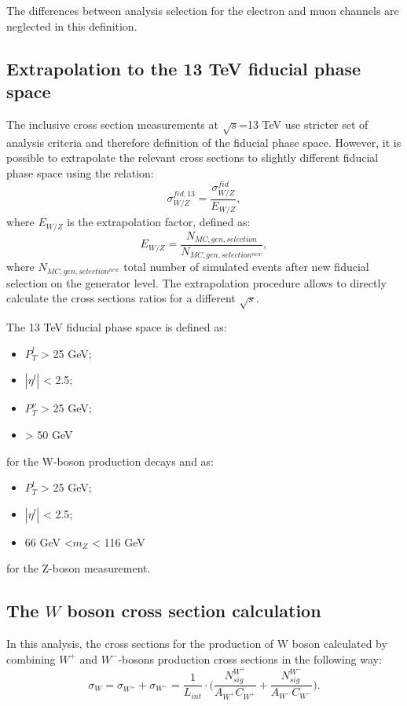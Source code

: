 The differences between analysis selection for the electron and muon channels are neglected in this definition.

\subsection{Extrapolation to the 13 TeV fiducial phase space}

The  inclusive cross section measurements at $\sqrt{s}$=13 TeV use stricter set of analysis criteria and therefore definition of the fiducial phase space. However, it is possible to extrapolate the relevant cross sections to slightly different fiducial phase space using the relation:
\begin{equation}
\sigma^{fid,13}_{W/Z} = \frac{\sigma^{fid}_{W/Z}}{E_{W/Z}},
\end{equation}
where $E_{W/Z}$ is the extrapolation factor, defined as:
\begin{equation}
E_{W/Z}=\frac{N_{MC,gen, selection}}{N_{MC,gen, selection^{new}}},
\end{equation}
where $N_{MC,gen, selection^{new}}$ total number of simulated events after new fiducial selection on the generator level. The extrapolation procedure allows to directly calculate the cross sections ratios for a different $\sqrt{s}$.

The 13 TeV fiducial phase space is defined as:
\begin{itemize}
\item $P_T^l$ > 25 GeV;
\item $|\eta^l|$ < 2.5;
\item $P_T^{\nu}$ > 25 GeV;
\item \mtw > 50 GeV
\end{itemize}
for the W-boson production decays and as:
\begin{itemize}
\item $P_T^l$ > 25 GeV;
\item $|\eta^l|$ < 2.5;
\item 66 GeV <$m_{Z}$ < 116 GeV
\end{itemize}
for the Z-boson measurement.

\subsection{The $W$ boson cross section calculation}\label{sec:Wcs}
In this analysis, the cross sections for the production of W boson calculated by combining $W^{+}$ and $W^{-}$-bosons production cross sections in the following way:
\begin{equation}
\sigma_{W}=\sigma_{W^{+}}+\sigma_{W^{-}} = \frac{1}{L_{int}} \cdot \Big(\frac{N^{W^+}_{sig}}{A_{W^+}C_{W^+}} +  \frac{N^{W^-}_{sig}}{A_{W^-}C_{W^-}} \Big). 
\end{equation}

